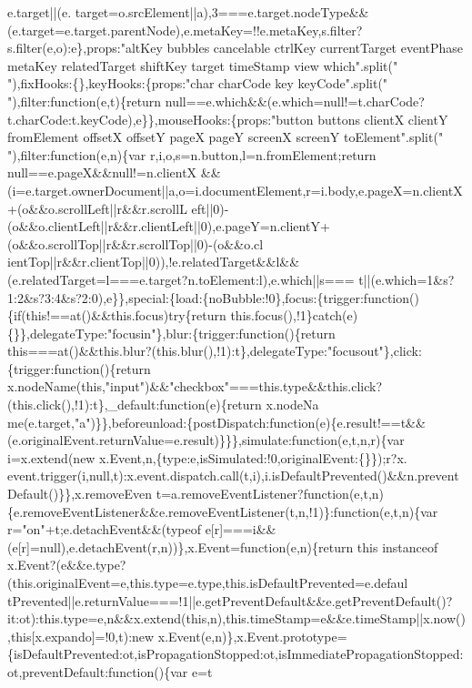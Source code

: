 \begin{DoxyCode}
{       e.target||(e.
      target=o.srcElement||a),3===e.target.nodeType&&(e.target=e.target.parentNode),e.metaKey=!!e.metaKey,s.filter?s.filter(e,o):e\},props:"altKey bubbles cancelable ctrlKey currentTarget eventPhase metaKey relatedTarget
       shiftKey target timeStamp view which".split(" "),fixHooks:\{\},keyHooks:\{props:"char charCode key
       keyCode".split(" "),filter:function(e,t)\{return
       null==e.which&&(e.which=null!=t.charCode?t.charCode:t.keyCode),e\}\},mouseHooks:\{props:"button buttons clientX clientY fromElement offsetX offsetY pageX pageY screenX screenY
       toElement".split(" "),filter:function(e,n)\{var r,i,o,s=n.button,l=n.fromElement;return
       null==e.pageX&&null!=n.clientX
      &&(i=e.target.ownerDocument||a,o=i.documentElement,r=i.body,e.pageX=n.clientX+(o&&o.scrollLeft||r&&r.scrollL
      eft||0)-(o&&o.clientLeft||r&&r.clientLeft||0),e.pageY=n.clientY+(o&&o.scrollTop||r&&r.scrollTop||0)-(o&&o.cl
      ientTop||r&&r.clientTop||0)),!e.relatedTarget&&l&&(e.relatedTarget=l===e.target?n.toElement:l),e.which||s===
      t||(e.which=1&s?1:2&s?3:4&s?2:0),e\}\},special:\{load:\{noBubble:!0\},focus:\{trigger:function()\{if(this!==at()&&this.focus)try\{return this.focus(),!1\}catch(e)\{\}\},delegateType:"focusin"\},blur:\{trigger:function()\{return
       this===at()&&this.blur?(this.blur(),!1):t\},delegateType:"focusout"\},click:\{trigger:function()\{return
       x.nodeName(this,"input")&&"checkbox"===this.type&&this.click?(this.click(),!1):t\},\_default:function(e)\{return
       x.nodeNa
      me(e.target,"a")\}\},beforeunload:\{postDispatch:function(e)\{e.result!==t&&(e.originalEvent.returnValue=e.result)\}\}\},simulate:function(e,t,n,r)\{var i=x.extend(new
       x.Event,n,\{type:e,isSimulated:!0,originalEvent:\{\}\});r?x.
      event.trigger(i,null,t):x.event.dispatch.call(t,i),i.isDefaultPrevented()&&n.preventDefault()\}\},x.removeEven
      t=a.removeEventListener?function(e,t,n)\{e.removeEventListener&&e.removeEventListener(t,n,!1)\}:function(e,t,n)\{var r="on"+t;e.detachEvent&&(typeof
       e[r]===i&&(e[r]=null),e.detachEvent(r,n))\},x.Event=function(e,n)\{return this instanceof
       x.Event?(e&&e.type?(this.originalEvent=e,this.type=e.type,this.isDefaultPrevented=e.defaul
      tPrevented||e.returnValue===!1||e.getPreventDefault&&e.getPreventDefault()?it:ot):this.type=e,n&&x.extend(this,n),this.timeStamp=e&&e.timeStamp||x.now(),this[x.expando]=!0,t):new
       x.Event(e,n)\},x.Event.prototype=\{isDefaultPrevented:ot,isPropagationStopped:ot,isImmediatePropagationStopped:ot,preventDefault:function()\{var
       e=t
}
\end{DoxyCode}
